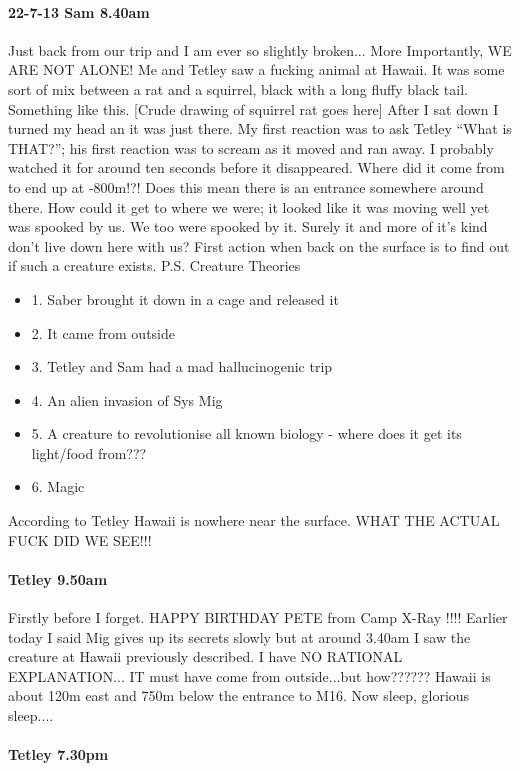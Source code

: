 \paragraph{22-7-13 Sam 8.40am}
Just back from our trip and I am ever so slightly broken...
More Importantly, WE ARE NOT ALONE! Me and Tetley saw a fucking animal at Hawaii. It was some sort of mix between a rat and a squirrel, black with a long fluffy black tail. Something like this. 
[Crude drawing of squirrel rat goes here]
After I sat down I turned my head an it was just there. My first reaction was to ask Tetley “What is THAT?”; his first reaction was to scream as it moved and ran away. I probably watched it for around ten seconds before it disappeared. Where did it come from to end up at -800m!?! Does this mean there is an entrance somewhere around there. How could it get to where we were; it looked like it was moving well yet was spooked by us. We too were spooked by it. Surely it and more of it’s kind don’t live down here with us? First action when back on the surface is to find out if such a creature exists.
P.S. Creature Theories
\begin{itemize}
\item 1. Saber brought it down in a cage and released it
\item 2. It came from outside
\item 3. Tetley and Sam had a mad hallucinogenic trip
\item 4. An alien invasion of Sys Mig
\item 5. A creature to revolutionise all known biology - where does it get its light/food from???
\item 6. Magic
\end{itemize}
According to Tetley Hawaii is nowhere near the surface. WHAT THE ACTUAL FUCK DID WE SEE!!!


\paragraph{Tetley 9.50am}
Firstly before I forget.
HAPPY BIRTHDAY PETE
from Camp X-Ray !!!!
Earlier today I said Mig gives up its secrets slowly but at around 3.40am I saw the creature at Hawaii previously described. I have NO RATIONAL EXPLANATION... IT must have come from outside...but how??????
Hawaii is about 120m east and 750m below the entrance to M16. Now sleep, glorious sleep....

\paragraph{Tetley 7.30pm}

